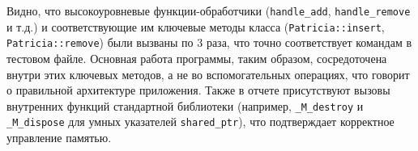 Видно, что высокоуровневые функции-обработчики (\texttt{handle\_add}, \texttt{handle\_remove} и т.д.) и соответствующие им ключевые методы класса (\texttt{Patricia::insert}, \texttt{Patricia::remove}) были вызваны по 3 раза, что точно соответствует командам в тестовом файле. Основная работа программы, таким образом, сосредоточена внутри этих ключевых методов, а не во вспомогательных операциях, что говорит о правильной архитектуре приложения. Также в отчете присутствуют вызовы внутренних функций стандартной библиотеки (например, \texttt{\_M\_destroy} и \texttt{\_M\_dispose} для умных указателей \texttt{shared\_ptr}), что подтверждает корректное управление памятью.
\pagebreak